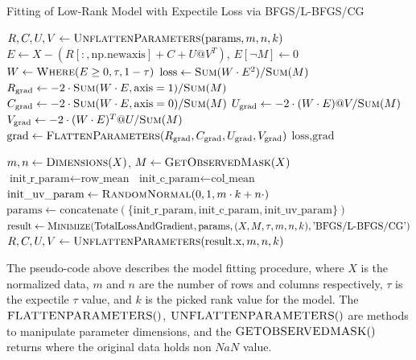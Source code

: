 \documentclass{article}
\begin{document}
\begin{algorithm}[H]
\caption{Fitting of Low-Rank Model with Expectile Loss via BFGS/L-BFGS/CG}
\begin{algorithmic}[1]
    \State $R, C, U, V \gets \Call{UnflattenParameters}{\text{params}, m, n, k}$
    \State $E \gets X - (R[:, \text{np.newaxis}] + C + U @ V^T)$, $E[\neg M] \gets 0$
    \State $W \gets \Call{Where}{E \geq 0, \tau, 1 - \tau}$
    \State $\text{loss} \gets \Call{Sum}{W \cdot E^2} / \Call{Sum}{M}$
    \State $R_{\text{grad}} \gets -2 \cdot \Call{Sum}{W \cdot E, \text{axis}=1} / \Call{Sum}{M}$
    \State $C_{\text{grad}} \gets -2 \cdot \Call{Sum}{W \cdot E, \text{axis}=0} / \Call{Sum}{M}$
    \State $U_{\text{grad}} \gets -2 \cdot (W \cdot E) @ V / \Call{Sum}{M}$
    \State $V_{\text{grad}} \gets -2 \cdot (W \cdot E)^T @ U / \Call{Sum}{M}$
    \State $\text{grad} \gets \Call{FlattenParameters}{R_{\text{grad}}, C_{\text{grad}}, U_{\text{grad}}, V_{\text{grad}}}$
    \State \Return $\text{loss}, \text{grad}$
\EndFunction


    \State $m, n \gets \Call{Dimensions}{X}$, $M \gets \Call{GetObservedMask}{X}$
    \State $\text{init\_r\_param} \gets \text{row\_mean}$
    \State $\text{init\_c\_param} \gets \text{col\_mean}$
    \State $\text{init\_uv\_param} \gets \Call{RandomNormal}{0, 1, m \cdot k + n \cdot}$
    \State $\text{params} \gets \text{concatenate}(\{\text{init\_r\_param}, \text{init\_c\_param}, \text{init\_uv\_param}\})$
    \State $\text{result} \gets \Call{Minimize}{\text{TotalLossAndGradient}, \text{params}, (X, M, \tau, m, n, k), \text{'BFGS/L-BFGS/CG'}}$
    \State \Return $R, C, U, V \gets \Call{UnflattenParameters}{\text{result.x}, m, n, k}$
\EndFunction
\end{algorithmic}
\end{algorithm}
The pseudo-code above describes the model fitting procedure, where $X$ is the normalized data, $m$ and $n$ are the number of rows and columns respectively, $\tau$ is the expectile $\tau$ value, and $k$ is the picked rank value for the model. The $\Call{FLATTENPARAMETERS}$, $\Call{UNFLATTENPARAMETERS}$ are methods to manipulate parameter dimensions, and the $\Call{GETOBSERVEDMASK}$ returns where the original data holds non $NaN$ value.
\end{document}
